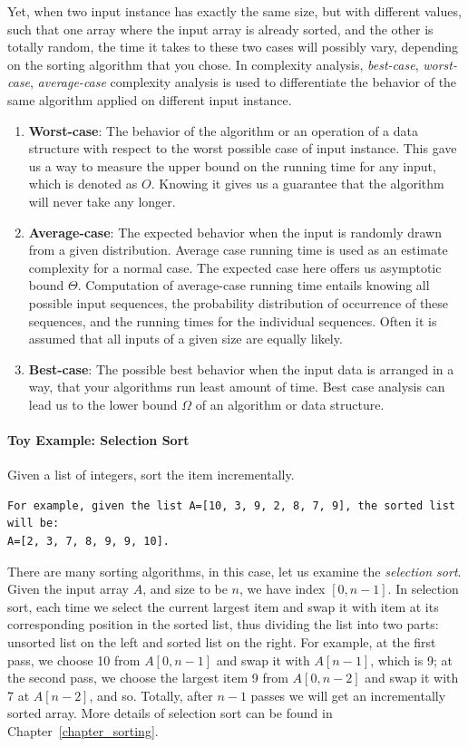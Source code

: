 \documentclass[../main.tex]{subfiles}
\begin{document}
Yet, when two input instance has exactly the same size, but with different values, such that one array where the input array is already sorted, and the other is totally random, the time it takes to these two cases will possibly vary, depending on the sorting algorithm that you chose. In complexity analysis, \textit{best-case}, \textit{worst-case}, \textit{average-case} complexity analysis is used to differentiate the behavior of the same algorithm applied on different input instance.  
\begin{enumerate}
    \item \textbf{Worst-case}: The behavior of the algorithm or an operation of a data structure with respect to the worst possible case of input instance.  This gave us a way to measure the upper bound on the running time for any input, which is denoted as $O$. Knowing it gives us a guarantee that the algorithm will never take any longer. 
    \item \textbf{Average-case}:  The expected behavior when the input is randomly drawn from a given distribution. Average case running time is used as an estimate complexity for a normal case. The expected case here offers us asymptotic bound $\Theta$.  Computation of average-case running time entails knowing all possible input sequences, the probability distribution of occurrence of these sequences, and the running times for the individual sequences. Often it is assumed that all inputs of a given size are equally likely. 
    \item \textbf{Best-case}: The possible best behavior when  the input data is arranged in a way, that your algorithms run least amount of time. Best case analysis can lead us to the lower bound $\Omega$ of an algorithm or data structure. 
\end{enumerate}

\paragraph{Toy Example: Selection Sort} Given a list of integers, sort the item incrementally.
\begin{lstlisting}[numbers=none]
For example, given the list A=[10, 3, 9, 2, 8, 7, 9], the sorted list will be:
A=[2, 3, 7, 8, 9, 9, 10].
\end{lstlisting}
There are many sorting algorithms, in this case, let us examine the \textit{selection sort}. Given the input array $A$, and size to be $n$, we have index $[0, n-1]$. In selection sort, each time we select the current largest item and swap it with item at its corresponding position in the sorted list, thus dividing the list into two parts: unsorted list on the left and sorted list on the right. For example, at the first pass, we choose 10 from $A[0,n-1]$ and swap it with $A[n-1]$, which is 9;  at the second pass, we choose the largest item 9 from $A[0,n-2]$ and swap it with 7 at $A[n-2]$, and so. Totally, after $n-1$ passes we will get an incrementally sorted array. More details of selection sort can be found in Chapter~\ref{chapter_sorting}. 
\end{document}
